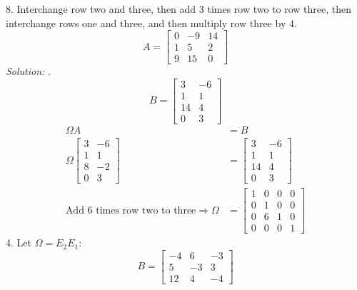 \documentclass[11pt]{homework}
\begin{document}
8. Interchange row two and three,
then add 3 times row two to row three,
then interchange rows one and three,
and then multiply row three by 4.
\begin{equation*}
A = 
  \begin{bmatrix}
  0 & -9 & 14 \\
  1 & 5 & 2 \\
  9 & 15 & 0 
  \end{bmatrix}
\end{equation*}
\newpage
\emph{Solution:}
. 
\begin{equation*}
B = 
  \begin{bmatrix}
  3 & -6 \\
  1 & 1 \\
  14 & 4 \\
  0 & 3 
  \end{bmatrix}
\end{equation*}
\begin{align*}
\Omega A &= B \\
\Omega  
  \begin{bmatrix}
  3 & -6 \\
  1 & 1 \\
  8 & -2 \\
  0 & 3 
  \end{bmatrix}
  &=
  \begin{bmatrix}
  3 & -6 \\
  1 & 1 \\
  14 & 4 \\
  0 & 3 
  \end{bmatrix} \\
\text{Add 6 times row two to three}
\Rightarrow 
\Omega &= 
  \begin{bmatrix}
  1 & 0 & 0 & 0 \\
  0 & 1 & 0 & 0 \\
  0 & 6 & 1 & 0 \\
  0 & 0 & 0 & 1 
  \end{bmatrix}
\end{align*}
4. Let $\Omega = E_2 E_1$:
\begin{equation*}
B = 
  \begin{bmatrix}
  -4 & 6 & -3 \\
  5 & -3 & 3  \\
  12 & 4 & -4
  \end{bmatrix}
\end{equation*}
\end{document}
